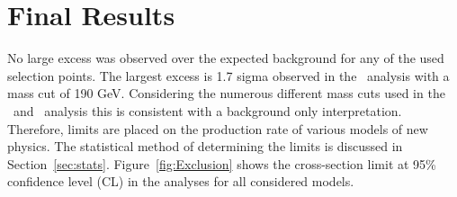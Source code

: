 \section{Final Results}
No large excess was observed over the expected background for any of the used selection points.
The largest excess is 1.7 sigma observed in the \tkonly\ analysis with
a mass cut of 190 GeV. Considering the numerous different mass cuts used in the \tktof\ and \tkonly\ analysis this is consistent with a background only interpretation.
Therefore, limits are placed on the production rate of various models of new physics. The statistical method of determining the limits is discussed in
Section~\ref{sec:stats}. Figure~\ref{fig:Exclusion} shows the cross-section limit at 95\% confidence level (CL) in the analyses for all considered models.

